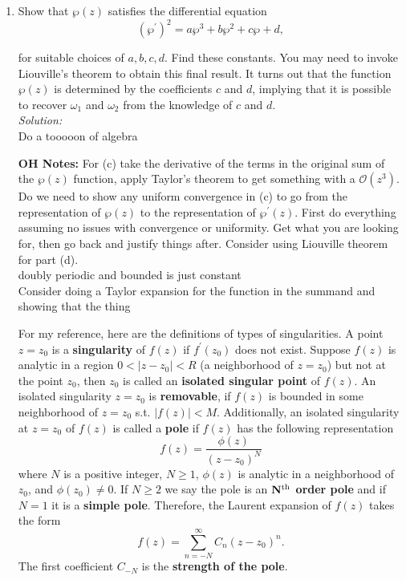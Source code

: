 \documentclass[10pt]{amsart}
\theoremstyle{nonumberplain}
\begin{document}
\begin{enumerate}[label={\bf {\arabic*}:}]
\begin{enumerate}
\item Show that $\wp(z)$ satisfies the differential equation
$$ \left(\wp^{\prime}\right)^2=a \wp^3+b \wp^2+c \wp+d, $$

for suitable choices of $a, b, c, d$. Find these constants. You may need to invoke Liouville's theorem to obtain this final result. It turns out that the function $\wp(z)$ is determined by the coefficients $c$ and $d$, implying that it is possible to recover $\omega_1$ and $\omega_2$ from the knowledge of $c$ and $d$. \\
\textit{Solution:} \\
Do a tooooon of algebra


{\bf OH Notes: }
For (c) take the derivative of the terms in the original sum of the $\wp(z)$ function, apply Taylor's theorem to get something with a $\mathcal O(z^3)$.
Do we need to show any uniform convergence in (c) to go from the representation of $\wp(z)$ to the representation of $\wp^\prime(z)$.
First do everything assuming no issues with convergence or uniformity.
Get what you are looking for, then go back and justify things after.
Consider using Liouville theorem for part (d). \\

\noindent
doubly periodic and bounded is just constant \\

\noindent
Consider doing a Taylor expansion for the function in the summand and showing that the thing

\newpage
\noindent
For my reference, here are the definitions of types of singularities.
A point $z=z_0$ is a {\bf singularity} of $f(z)$ if $f^\prime(z_0)$ does not exist.
Suppose $f(z)$ is analytic in a region $0 < |z - z_0| < R$ (a neighborhood of $z = z_0$) but not at the point $z_0$, then $z_0$ is called an {\bf isolated singular point} of $f(z)$.
An isolated singularity $z=z_0$ is {\bf removable}, if $f(z)$ is bounded in some neighborhood of $z=z_0$ s.t. $|f(z)| < M$.
Additionally, an isolated singularity at $z = z_0$ of $f(z)$ is called a {\bf pole} if $f(z)$ has the following representation
$$
f(z) = \frac {\phi (z)}{(z - z_0)^N}
$$
where $N$ is a positive integer, $N \geq 1$, $\phi(z)$ is analytic in a neighborhood of $z_0$, and $\phi(z_0) \neq 0$.
If $N \geq 2$ we say the pole is an {\bf ${\bf N}^{\rm th}$ order pole} and if $N = 1$ it is a {\bf simple pole}.
Therefore, the Laurent expansion of $f(z)$ takes the form
$$
f(z) = \sum_{n=-N}^\infty C_n(z - z_0)^n.
$$
The first coefficient $C_{-N}$ is the {\bf strength of the pole}. 
\end{enumerate}
\end{enumerate}
\end{document}
